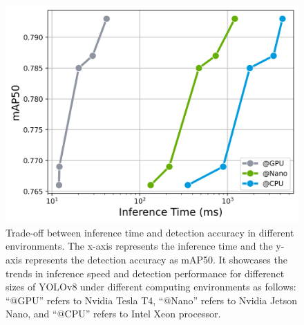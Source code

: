 \begin{figure}[!t]
    \includegraphics[scale=0.5]{fig/plot_inference_time.png}
    \caption{Trade-off between inference time and detection accuracy in different environments. The x-axis represents the inference time and the y-axis represents the detection accuracy as mAP50. It showcases the trends in inference speed and detection performance for differenct sizes of YOLOv8 under different computing environments as follows: ``@GPU'' refers to Nvidia Tesla T4, ``@Nano'' refers to Nvidia Jetson Nano, and ``@CPU'' refers to Intel Xeon processor.}
    \label{fig:inference}
\end{figure}



